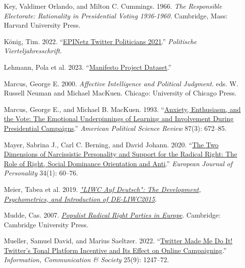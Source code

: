\documentclass[a4paper,11pt]{article}
\newlength{\cslhangindent}
\newenvironment{CSLReferences}[2] %
 {\setlength{\cslhangindent}{#2\parindent}%
  \setlength{\parindent}{0pt}%
  \everypar{\setlength{\hangindent}{\cslhangindent}}\ignorespaces}
 {\par}
\begin{document}
\begin{CSLReferences}{1}{0}
\leavevmode{}%
Key, Valdimer Orlando, and Milton C. Cummings. 1966. \emph{The {Responsible Electorate}: {Rationality} in {Presidential Voting} 1936-1960}. {Cambridge, Mass}: {Harvard University Press}.

\leavevmode{}%
König, Tim. 2022. {``\href{https://doi.org/10.7802/2415}{{EPINetz Twitter Politicians} 2021}.''} \emph{Politische Vierteljahresschrift}.

\leavevmode{}%
Lehmann, Pola et al. 2023. {``\href{https://doi.org/10.25522/MANIFESTO.MPDS.2023A}{Manifesto {Project Dataset}}.''}

\leavevmode{}%
Marcus, George E. 2000. \emph{Affective Intelligence and Political Judgment}. eds. W. Russell Neuman and Michael MacKuen. {Chicago}: {University of Chicago Press}.

\leavevmode{}%
Marcus, George E., and Michael B. MacKuen. 1993. {``\href{https://doi.org/10.2307/2938743}{Anxiety, {Enthusiasm}, and the {Vote}: {The Emotional Underpinnings} of {Learning} and {Involvement During Presidential Campaigns}}.''} \emph{American Political Science Review} 87(3): 672--85.

\leavevmode{}%
Mayer, Sabrina J., Carl C. Berning, and David Johann. 2020. {``\href{https://doi.org/10.1002/per.2228}{The {Two Dimensions} of {Narcissistic Personality} and {Support} for the {Radical Right}: {The Role} of {Right}, {Social Dominance Orientation} and {Anti}}.''} \emph{European Journal of Personality} 34(1): 60--76.

\leavevmode{}%
Meier, Tabea et al. 2019. \emph{\href{https://doi.org/10.31234/osf.io/uq8zt}{"{LIWC} Auf {Deutsch}": {The Development}, {Psychometrics}, and {Introduction} of {DE-LIWC2015}}}.

\leavevmode{}%
Mudde, Cas. 2007. \emph{\href{https://doi.org/10.1017/CBO9780511492037}{Populist {Radical Right Parties} in {Europe}}}. {Cambridge}: {Cambridge University Press}.

\leavevmode{}%
Mueller, Samuel David, and Marius Saeltzer. 2022. {``\href{https://doi.org/10.1080/1369118X.2020.1850841}{Twitter Made Me Do It! {Twitter}'s Tonal Platform Incentive and Its Effect on Online Campaigning}.''} \emph{Information, Communication \& Society} 25(9): 1247--72.


\end{CSLReferences}
\end{document}
